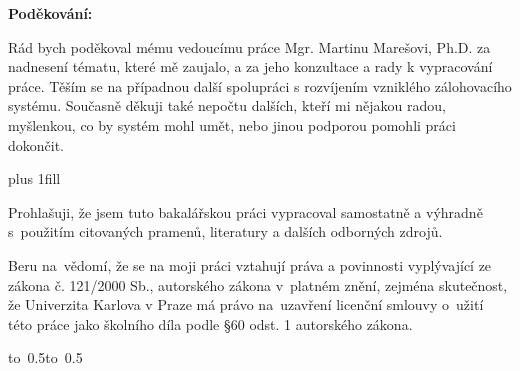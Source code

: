 \documentclass[12pt,a4paper]{report}
\let\openright=\clearpage
\begin{document}
\openright

\noindent
{\bf\large Poděkování:}
\medskip

\noindent
Rád bych poděkoval mému vedoucímu práce Mgr. Martinu Marešovi, Ph.D. za
nadnesení tématu, které mě zaujalo, a za jeho konzultace a rady k vypracování
práce. Těším se na případnou další spolupráci s rozvíjením vzniklého
zálohovacího systému. Současně děkuji také nepočtu dalších, kteří mi nějakou
radou, myšlenkou, co by systém mohl umět, nebo jinou podporou pomohli práci
dokončit.

\newpage


\vglue 0pt plus 1fill

\noindent
Prohlašuji, že jsem tuto bakalářskou práci vypracoval samostatně a výhradně
s~použitím citovaných pramenů, literatury a dalších odborných zdrojů.

\medskip\noindent
Beru na~vědomí, že se na moji práci vztahují práva a povinnosti vyplývající
ze zákona č. 121/2000 Sb., autorského zákona v~platném znění, zejména skutečnost,
že Univerzita Karlova v Praze má právo na~uzavření licenční smlouvy o~užití této
práce jako školního díla podle §60 odst. 1 autorského zákona.

\vspace{10mm}

\hbox{\hbox to 0.5\hbox to 0.5\hsize{%
\hss}}

\vspace{20mm}
\newpage

\end{document}
